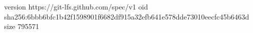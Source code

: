 version https://git-lfs.github.com/spec/v1
oid sha256:6bbb6bfc1b42f1598901f6682df915a32efb641e578dde73010eecfc45b6463d
size 795571
